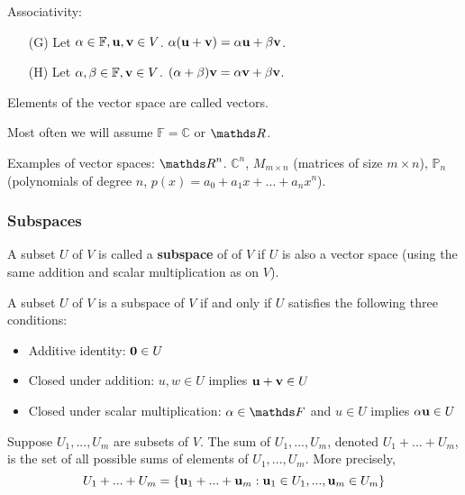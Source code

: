 \documentclass{article}
\begin{document}
Associativity:
\begin{enumerate}
\setlength\itemsep{0.1em}
    \item[(G)] Let $\alpha \in \mathbb{F}, {\mathbf{u}}, {\mathbf{v}} \in V$. $\alpha ({\mathbf{u}} + {\mathbf{v}}) = \alpha {\mathbf{u}} + \beta {\mathbf{v}}$.
    \item[(H)] Let $\alpha, \beta \in \mathbb{F}, {\mathbf{v}} \in V$. $(\alpha + \beta) {\mathbf{v}} = \alpha {\mathbf{v}} + \beta {\mathbf{v}}$.
\end{enumerate}

Elements of the vector space are called vectors.

Most often we will assume $\mathbb{F} = \mathbb{C}$ or $\R$.

Examples of vector spaces: $\R^n$. $\mathbb{C}^n$, $M_{m \times n}$ (matrices of size $m \times n$), $\mathbb{P}_n$ (polynomials of degree $n$, $p(x) = a_0 + a_1 x + \ldots + a_n x^n$).

\subsubsection{Subspaces}

\begin{definition}
A subset $U$ of $V$ is called a \textbf{subspace} of of $V$ if $U$ is also a vector space (using the same addition and scalar multiplication as on $V$).
\end{definition}


\begin{proposition}
A subset $U$ of $V$ is a subspace of $V$ if
and only if $U$ satisfies the following three conditions:
\begin{itemize}
\item Additive identity: ${\mathbf{0}} \in U$
\item Closed under addition: $u,w\in U$ implies ${\mathbf{u}}+{\mathbf{v}} \in U$
\item Closed under scalar multiplication: $\alpha \in\F$ and $u\in U$
implies $\alpha {\mathbf{u}} \in U$
\end{itemize}
\end{proposition}


\begin{definition}
Suppose $U_{1},...,U_{m}$ are subsets of $V$. The sum
of $U_{1},...,U_{m}$, denoted $U_{1}+...+U_{m}$, is the set of all
possible sums of elements of $U_{1},...,U_{m}.$ More precisely,
\[
U_{1}+...+U_{m}=\{{\mathbf{u}}_{1}+...+{\mathbf{u}}_{m}:{\mathbf{u}}_{1}\in U_{1},...,{\mathbf{u}}_{m}\in U_{m}\}
\]
\end{definition}
\end{document}
